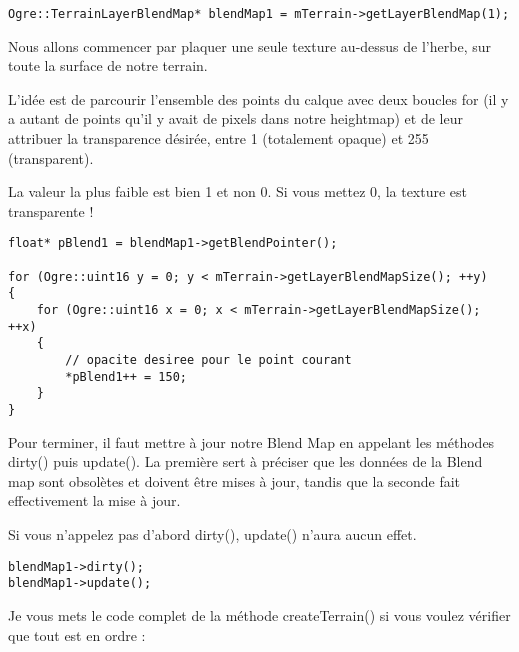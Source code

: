 \documentclass[10pt,a4paper]{report}
\begin{document}
\begin{lstlisting}[caption={R\'ecup\'eration du Blend Map pour le premier terrain}]
Ogre::TerrainLayerBlendMap* blendMap1 = mTerrain->getLayerBlendMap(1);
\end{lstlisting}

Nous allons commencer par plaquer une seule texture au-dessus de l'herbe, sur toute la surface de notre terrain.

L'id\'ee est de parcourir l'ensemble des points du calque avec deux boucles for (il y a autant de points qu'il y avait de pixels dans notre heightmap) et de leur attribuer la transparence d\'esir\'ee, entre 1 (totalement opaque) et 255 (transparent).

La valeur la plus faible est bien 1 et non 0. Si vous mettez 0, la texture est transparente !

\begin{lstlisting}[caption={Attribution de la transparence d\'esir\'ee sur tous les points du calque}]
float* pBlend1 = blendMap1->getBlendPointer();

for (Ogre::uint16 y = 0; y < mTerrain->getLayerBlendMapSize(); ++y)
{
    for (Ogre::uint16 x = 0; x < mTerrain->getLayerBlendMapSize(); ++x)
    {   
        // opacite desiree pour le point courant
        *pBlend1++ = 150;
    }
}
\end{lstlisting}















Pour terminer, il faut mettre \`a jour notre Blend Map en appelant les m\'ethodes dirty() puis update(). La premi\`ere sert \`a pr\'eciser que les donn\'ees de la Blend map sont obsol\`etes et doivent \^etre mises \`a jour, tandis que la seconde fait effectivement la mise \`a jour.

Si vous n'appelez pas d'abord dirty(), update() n'aura aucun effet.

\begin{lstlisting}[caption={Mise \`a jour de la Blend Map}]
blendMap1->dirty();
blendMap1->update();
\end{lstlisting}

Je vous mets le code complet de la m\'ethode createTerrain() si vous voulez v\'erifier que tout est en ordre :
\end{document}
